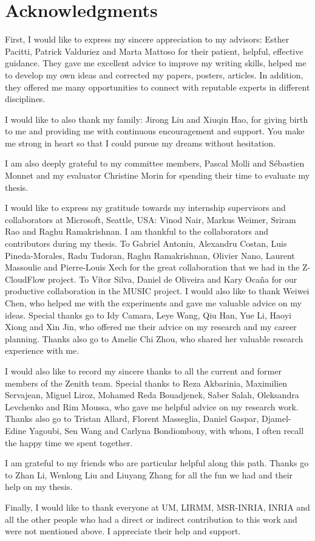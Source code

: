 \chapter{Acknowledgments}

First, I would like to express my sincere appreciation to my advisors: Esther Pacitti, Patrick Valduriez and Marta Mattoso for their patient, helpful, effective guidance. They gave me excellent advice to improve my writing skills, helped me to develop my own ideas and corrected my papers, posters, articles. In addition, they offered me many opportunities to connect with reputable experts in different disciplines. 

I would like to also thank my family: Jirong Liu and Xiuqin Hao, for giving birth to me and providing me with continuous encouragement and support. You make me strong in heart so that I could pursue my dreams without hesitation.

I am also deeply grateful to my committee members, Pascal Molli and Sébastien Monnet and my evaluator Christine Morin for spending their time to evaluate my thesis.


I would like to express my gratitude towards my internship supervisors and collaborators at Microsoft, Seattle, USA: Vinod Nair, Markus Weimer, Sriram Rao and Raghu Ramakrishnan.
I am thankful to the collaborators and contributors during my thesis. To Gabriel Antoniu, Alexandru Costan, Luis Pineda-Morales, Radu Tudoran, Raghu Ramakrishnan, Olivier Nano, Laurent Massoulie and Pierre-Louis Xech for the great collaboration that we had in the Z-CloudFlow project. 
To Vítor Silva, Daniel de Oliveira and Kary Ocaña for our productive collaboration in the MUSIC project.
I would also like to thank Weiwei Chen, who helped me with the experiments and gave me valuable advice on my ideas. 
Special thanks go to Idy Camara, Leye Wang, Qiu Han, Yue Li, Haoyi Xiong and Xin Jin, who offered me their advice on my research and my career planning. 
Thanks also go to Amelie Chi Zhou, who shared her valuable research experience with me.

I would also like to record my sincere thanks to all the current and former members of the Zenith team. Special thanks to Reza Akbarinia, Maximilien Servajean, Miguel Liroz, Mohamed Reda Bouadjenek, Saber Salah, Oleksandra Levchenko and Rim Moussa, who gave me helpful advice on my research work. 
Thanks also go to Tristan Allard, Florent Masseglia, Daniel Gaspar, Djamel-Edine Yagoubi, Sen Wang and Carlyna Bondiombouy, with whom, I often recall the happy time we spent together.

I am grateful to my friends who are particular helpful along this path. Thanks go to Zhan Li, Wenlong Liu and Liuyang Zhang for all the fun we had and their help on my thesis.

Finally, I would like to thank everyone at UM, LIRMM, MSR-INRIA, INRIA and all the other people who had a direct or indirect contribution to this work and were not mentioned above. I appreciate their help and support.